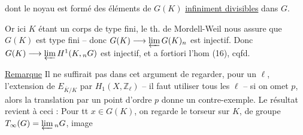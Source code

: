 dont le noyau  est formé des éléments de $G(K)$ \uline{infiniment divisibles} dans $G$.

Or ici $K$ étant un  corps  de type fini, le th. de Mordell-Weil nous assure que $G(K)$ est   type fini -- donc $G(K)\longrightarrow\varprojlim G(K)_n$ est injectif. Donc $G(K)\longrightarrow\varprojlim H^1(K,{}_nG)$ est injectif, et a fortiori l'hom (16), cqfd.

\uline{Remarque} Il ne suffirait pas dans cet argument de regarder, pour un $\ell$, l'extension de $E_{\overline K/K}$ par $H_1(X,\mathbb Z_\ell)$ -- il faut utiliser tous les $\ell$ -- si on omet $p$, alors la translation par un point d'ordre $p$ donne un contre-exemple.  Le résultat revient à ceci : Pour tt $x\in G(K)$, on regarde le torseur sur $K$, de groupe $T_\infty(G)=\varprojlim {}_nG$, image
